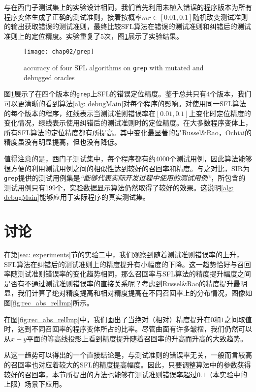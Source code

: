 与在西门子测试集上的实验设计相同，我们首先利用未植入错误的程序版本为所有程序变体生成了正确的测试准则，接着按概率$mr\in [0.01, 0.1]$随机改变测试准则的输出获取错误的测试准则，最终比较SFL算法在错误的测试准则和纠错后的测试准则上的定位精度。实验重复了5次，图\ref{Fig: grep}展示了实验结果。

\begin{figure}
	\texttt{[image: chap02/grep]}
	\caption{accuracy of four SFL algorithms on \texttt{grep} with mutated and debugged oracles}
	\label{Fig: grep}
\end{figure}

图\ref{Fig: grep}展示了在四个版本的\texttt{grep}上SFL的错误定位精度。鉴于总共只有4个版本，我们可以更清晰的看到算法\ref{alg: debugMain}对每个程序的影响。对使用同一SFL算法的每个版本的程序，红线表示当测试准则错误率在$[0.01,0.1]$上变化时定位精度的变化情况，绿线表示使用纠错后的测试准则时的定位精度。在大多数程序变体上，所有SFL算法的定位精度都有所提高。其中变化最显著的是Russel\&Rao，Ochiai的精度虽没有明显提高，但也没有降低。

值得注意的是，西门子测试集中，每个程序都有约4000个测试用例，因此算法能够很方便的利用测试用例之间的相似性达到较好的召回率和精度。与之对比，SIR为\texttt{grep}提供的测试用例集是\textit{“能够代表实际开发过程中使用的测试用例”}\cite{doESE05}，所包含的测试用例只有199个，实验数据显示算法仍然取得了较好的效果。这说明\ref{alg: debugMain}能够应用于实际程序的真实测试集。

\section{讨论}
在第\ref{sec: experiments}节的实验二中，我们观察到随着测试准则错误率的上升，SFL算法在纠错后的测试准则上的精度提升有小幅度的下降。这一趋势恰好与召回率随测试准则错误率的变化趋势相同，那么召回率与SFL算法的精度提升幅度之间是否有不通过测试准则错误率的直接关系呢？考虑到Russel\&Rao的精度提升最明显，我们计算了绝对精度提高和相对精度提高在不同召回率上的分布情况，图像如图\ref{fig:rec_abs_relImp}所示。

在图\ref{fig:rec_abs_relImp}中，我们画出了当绝对（相对）精度提升在$0$和$1$之间取值时，达到不同召回率的程序变体所占的比率。尽管曲面有许多皱褶，我们仍然可以从$x-y$平面的等高线投影上看到精度提升随着召回率的升高而升高的大致趋势。

从这一趋势可以得出的一个直接结论是，与测试准则的错误率无关，一般而言较高的召回率也对应着较大的SFL的精度提高幅度。因此，只要调整算法中的参数获得较好的召回率，本节所提出的方法也能够在测试准则错误率超过$0.1$（本实验中的上限）场景下应用。

